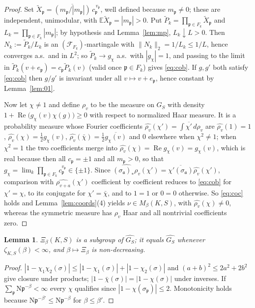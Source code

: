 \documentclass[11pt]{amsart}
\numberwithin{equation}{section}
\newtheorem{lemma}[theorem]{Lemma}
\theoremstyle{definition}
\theoremstyle{remark}
\newcommand{\Ns}{\mathrm{N}}
\newcommand{\cF}{\mathcal{F}}
\newcommand{\pp}{\mathfrak{p}}
\newcommand{\aaa}{\mathfrak{a}}
\begin{document}
\begin{proof}
Set $\tilde X_\pp=\overline{(m_\pp/|m_\pp|)}\,c_\pp^{\,v_\pp}$, well defined
because $m_\pp\neq0$; these are independent, unimodular, with
$\mathbb E\tilde X_\pp=|m_\pp|>0$. Put $\tilde P_k=\prod_{\pp\in F_k}\tilde X_\pp$
and $L_k=\prod_{\pp\in F_k}|m_\pp|$; by hypothesis and Lemma~\ref{lem:mp},
$L_k\downarrow L>0$. Then $N_k:=\tilde P_k/L_k$ is an $(\cF_{F_k})$-martingale
with $\|N_k\|_2=1/L_k\le1/L$, hence converges a.s.\ and in $L^2$; so
$\tilde P_k\to g_\chi$ a.s.\ with $|g_\chi|=1$, and passing to the limit in
$\tilde P_k(v+e_\pp)=c_\pp\tilde P_k(v)$ (valid once $\pp\in F_k$) gives
\eqref{eq:cob}. If $g,g'$ both satisfy \eqref{eq:cob} then $g/g'$ is invariant
under all $v\mapsto v+e_\pp$, hence constant by Lemma~\ref{lem:01}.

Now let $\chi\neq1$ and define $\rho_v$ to be the measure on $G_S$ with density
$1+\operatorname{Re}\bigl(g_\chi(v)\chi(g)\bigr)\ge0$ with respect to
normalized Haar measure. It is a probability measure whose Fourier coefficients
$\widehat{\rho_v}(\chi')=\int\overline{\chi'}\,d\rho_v$ are
$\widehat{\rho_v}(1)=1$, $\widehat{\rho_v}(\chi)=\tfrac12g_\chi(v)$,
$\widehat{\rho_v}(\bar\chi)=\tfrac12\overline{g_\chi(v)}$ and $0$ elsewhere when
$\chi^2\neq1$; when $\chi^2=1$ the two coefficients merge into
$\widehat{\rho_v}(\chi)=\operatorname{Re}g_\chi(v)=g_\chi(v)$, which is real because then
all $c_\pp=\pm1$ and all $m_\pp>0$, so that $g_\chi=\lim_k\prod_{\pp\in F_k}c_\pp^{v_\pp}\in\{\pm1\}$.
Since $\widehat{(\sigma_\aaa)_*\rho_v}(\chi')=\overline{\chi'(\sigma_\aaa)}\widehat{\rho_v}(\chi')$,
comparison with $\widehat{\rho_{v+a}}(\chi')$ coefficient by coefficient reduces
to \eqref{eq:cob} for $\chi'=\chi$, to its conjugate for $\chi'=\bar\chi$, and
to $1=1$ or $0=0$ otherwise. So \eqref{eq:coc} holds and
Lemma~\ref{lem:coords}(4) yields $\nu\in M_\beta(K,S)$, with
$\widehat{\rho_v}(\chi)\neq0$, whereas the symmetric measure has $\rho_v$ Haar
and all nontrivial coefficients zero.
\end{proof}

\begin{lemma}\label{lem:subgroup}
$\Xi_\beta(K,S)$ is a subgroup of $\widehat{G_S}$; it equals $\widehat{G_S}$
whenever $\zeta_{K,S}(\beta)<\infty$, and $\beta\mapsto\Xi_\beta$ is
non-decreasing.
\end{lemma}

\begin{proof}
$|1-\chi_1\chi_2(\sigma)|\le|1-\chi_1(\sigma)|+|1-\chi_2(\sigma)|$ and
$(a+b)^2\le2a^2+2b^2$ give closure under products;
$|1-\bar\chi(\sigma)|=|1-\chi(\sigma)|$ under inverses. If
$\sum_\pp\Ns\pp^{-\beta}<\infty$ every $\chi$ qualifies since
$|1-\chi(\sigma_\pp)|\le2$. Monotonicity holds because
$\Ns\pp^{-\beta'}\le\Ns\pp^{-\beta}$ for $\beta\le\beta'$.
\end{proof}
\end{document}

